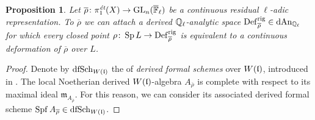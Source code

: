 \documentclass[10pt,a4paper]{amsart}
\numberwithin{equation}{subsection}
\theoremstyle{plain}
\newtheorem{prop}[theorem]{Proposition}
\theoremstyle{definition}
\theoremstyle{remark}
\numberwithin{equation}{section}
\begin{document}
\begin{prop} \label{moc}
Let $\overline{\rho} \colon \pi_1^{\emph{\text{\'et}}}(X) \to \mathrm{GL}_n(\overline{\mathbb F}_\ell)$ be a continuous residual $\ell$-adic representation.
To $\overline{\rho}$ we can attach a derived $\mathbb{Q}_\ell$-analytic space $\mathbf{\mathrm{Def}}_{\overline{ \rho}}^{\mathrm{rig} } \in \mathrm{dAn}_{\mathbb{Q}_\ell}$ for which every closed point $\rho \colon \operatorname{Sp} L \to \mathbf{\mathrm{Def}}_{\overline{\rho}}^{\mathrm{rig}}$ is equivalent to a continuous deformation of $\overline{\rho}$ over
$L$.
\end{prop}


\begin{proof}
Denote by $\mathrm{dfSch}_{W(\mathfrak l)}$ the \infcat of \emph{derived formal schemes} over $W(\mathfrak l)$, introduced in \cite[section 2.8]{lurieSAG}.
The local Noetherian derived $W(\mathfrak l)$-algebra $A_{\overline{\rho}}$ is complete with respect to its maximal ideal $\mathfrak m_{A_{\overline{\rho}}}$. For this reason, we can consider its associated derived formal scheme $\operatorname{Spf} A_{\overline{\rho}} \in 
\mathrm{dfSch}_{W(\mathfrak l)}$.


\end{proof}
\end{document}

